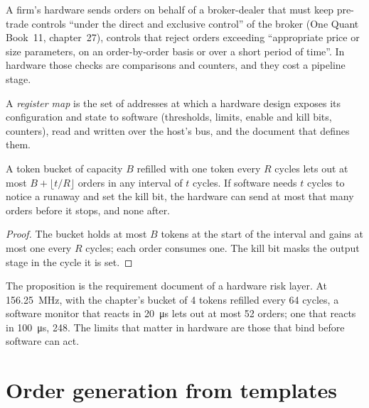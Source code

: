 A firm's hardware sends orders on behalf of a broker-dealer that must keep pre-trade controls ``under the direct and exclusive
control'' of the broker (One Quant Book~11, chapter~27), controls that reject orders exceeding ``appropriate price or size parameters,
on an order-by-order basis or over a short period of time''. In hardware those checks are comparisons and counters, and they cost a
pipeline stage.

\begin{definition}\label{def:nw:programmable-hardware-ii-trading-designs:regmap}
A \emph{register map} is the set of addresses at which a hardware design exposes its configuration and state to
software (thresholds, limits, enable and kill bits, counters), read and written over the host's bus, and the document that defines
them.
\end{definition}

\label{lst:nw:programmable-hardware-ii-trading-designs:risk}

\begin{proposition}\label{prop:nw:programmable-hardware-ii-trading-designs:bucket}
A token bucket of capacity $B$ refilled with one token every $R$ cycles lets out at most $B + \lfloor t/R\rfloor$ orders in any interval
of $t$ cycles. If software needs $t$ cycles to notice a runaway and set the kill bit, the hardware can send at most that many orders
before it stops, and none after.
\end{proposition}

\begin{proof}
The bucket holds at most $B$ tokens at the start of the interval and gains at most one every $R$ cycles; each order consumes one. The
kill bit masks the output stage in the cycle it is set.
\end{proof}

The proposition is the requirement document of a hardware risk layer. At 156.25~MHz, with the chapter's bucket of 4 tokens refilled
every 64 cycles, a software monitor that reacts in \qty{20}{\micro\second} lets out at most 52 orders; one that reacts in
\qty{100}{\micro\second}, 248. The limits that matter in hardware are those that bind before software can act.

\section{Order generation from templates}

